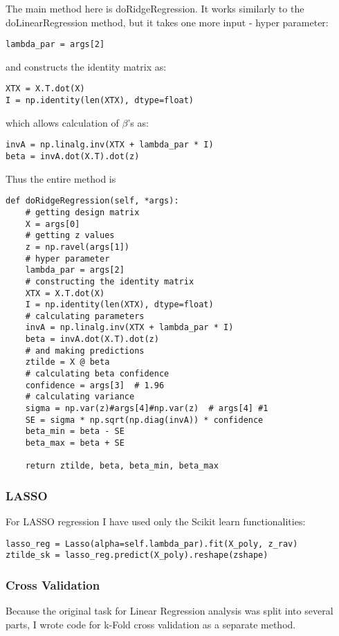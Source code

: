 The main method here is doRidgeRegression. It works similarly to the doLinearRegression method, but it takes one more input - hyper parameter:
\begin{lstlisting}
lambda_par = args[2]
\end{lstlisting}
and constructs the identity matrix as:
\begin{lstlisting}
XTX = X.T.dot(X)
I = np.identity(len(XTX), dtype=float)
\end{lstlisting}
which allows calculation of $\beta$'s as:
\begin{lstlisting}
invA = np.linalg.inv(XTX + lambda_par * I)
beta = invA.dot(X.T).dot(z)
\end{lstlisting}
Thus the entire method is
\begin{lstlisting}
def doRidgeRegression(self, *args):
    # getting design matrix
    X = args[0]
    # getting z values
    z = np.ravel(args[1])
    # hyper parameter
    lambda_par = args[2]
    # constructing the identity matrix
    XTX = X.T.dot(X)
    I = np.identity(len(XTX), dtype=float)
    # calculating parameters
    invA = np.linalg.inv(XTX + lambda_par * I)
    beta = invA.dot(X.T).dot(z)
    # and making predictions
    ztilde = X @ beta
    # calculating beta confidence
    confidence = args[3]  # 1.96
    # calculating variance
    sigma = np.var(z)#args[4]#np.var(z)  # args[4] #1
    SE = sigma * np.sqrt(np.diag(invA)) * confidence
    beta_min = beta - SE
    beta_max = beta + SE

    return ztilde, beta, beta_min, beta_max
\end{lstlisting}

\subsubsection{LASSO}

For LASSO regression I have used only the Scikit learn functionalities:
\begin{lstlisting}
lasso_reg = Lasso(alpha=self.lambda_par).fit(X_poly, z_rav)
ztilde_sk = lasso_reg.predict(X_poly).reshape(zshape)
\end{lstlisting}

\subsubsection{Cross Validation}
Because the original task for Linear Regression analysis was split into several parts, I wrote code for k-Fold cross validation as a separate method.

